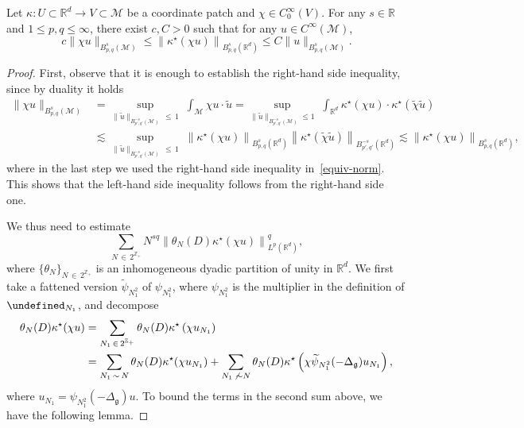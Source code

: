 \documentclass[AHL,Unicode,longabstracts,published]{cedram}
\newcommand{\Z}{\mathbb{Z}}
\newcommand{\R}{\mathbb{R}}
\let\P= \undefined
\newcommand{\P}{\mathbf{P}}
\newcommand{\M}{\mathcal{M}}
\newcommand{\g}{\mathfrak{g}}
\newcommand{\Dlg}{\Delta_{\g}}
\newcommand{\kk}{\kappa}
\newcommand{\wt}{\widetilde}
\newcommand{\les}{\lesssim}
\begin{document}
\begin{prop}\label{prop-norm}
Let $\kk: U\subset \R^d\rightarrow V\subset\M$ be a coordinate patch and $\chi\in C^{\infty}_0(V)$. For any $s\in\R$ and $1\leq p,q\leq \infty$, there exist $c,C>0$ such that for any $u\in C^{\infty}(\M)$,
\begin{equation}\label{equiv-norm}
c\|\chi u\|_{B^s_{p,q}(\M)}\leq \left\|\kk^{\star}(\chi u)\right\|_{B^{s}_{p,q}(\R^d)}\leq C\|u\|_{B^s_{p,q}(\M)}.
\end{equation}
\end{prop}

\begin{proof}
First, observe that it is enough to establish the right-hand side inequality, since by duality it holds
\begin{align*}
\|\chi u\|_{B^s_{p,q}(\M)} &= \sup_{\|\wt u\|_{B^{-s}_{p',q'}(\M)}\,\le\,1}\;\int_\M \chi u\cdot\wt u = \sup_{\|\wt u\|_{B^{-s}_{p',q'}(\M)}\le 1} \;\int_{\R^d} \kk^{\star}(\chi u)\cdot\kk^{\star}(\wt\chi\wt u)\\
& \les \sup_{\|\wt u\|_{B^{-s}_{p',q'}(\M)}\,\le\, 1}\;\left\|\kk^{\star}(\chi u)\right\|_{B^s_{p,q}(\R^d)} \left\|\kk^{\star}(\wt\chi\wt u)\right\|_{B^{-s}_{p',q'}(\R^d)} \les \left\|\kk^{\star}(\chi u)\right\|_{B^s_{p,q}(\R^d)},
\end{align*}
where in the last step we used the right-hand side inequality in~\eqref{equiv-norm}. This shows that the left-hand side inequality follows from the right-hand side one.

We thus need to estimate
\begin{equation*}
\sum_{N\,\in\,2^{\Z_+}}N^{sq}\left\|\theta_N(D)\kk^{\star}(\chi u)\right\|_{L^p(\R^d)}^q,
\end{equation*}
where $\{\theta_N\}_{N\,\in\,2^{\Z_+}}$ is an inhomogeneous dyadic partition of unity in $\R^d$. We first take a fattened version $\widetilde{\psi}_{N_1^2}$ of $\psi_{N_1^2}$, where $\psi_{N_1^2}$ is the multiplier in the definition of $\P_{N_1}$, and decompose
\begin{align*}
\theta_N(D)\kk^{\star}(\chi u) &= \sum_{N_1\,\in \,2^{\Z_+}}\theta_N(D)\kk^{\star}\left(\chi u_{N_1}\right)\\
&=\sum_{N_1\,\sim\,N}\theta_N(D)\kk^{\star}(\chi u_{N_1})+\sum_{N_1\,\not\,\sim N}\theta_N(D)\kk^{\star}\left(\chi\widetilde{\psi}_{N_1^2}(-\Dlg)u_{N_1}\right),
\end{align*}
where $u_{N_1}=\psi_{N_1^2}(-\Dlg)u$. To bound the terms in the second sum above, we have the following lemma.


\end{proof}
\end{document}
